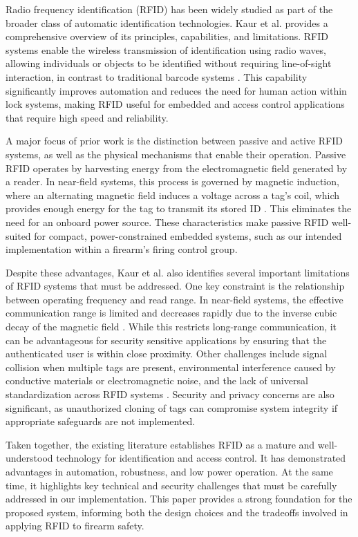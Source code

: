 Radio frequency identification (RFID) has been widely studied as part of the broader 
class of automatic identification technologies. Kaur et al. provides a comprehensive 
overview of its principles, capabilities, and limitations. RFID systems enable the wireless 
transmission of identification using radio waves, allowing individuals or objects to be 
identified without requiring line-of-sight interaction, in contrast to traditional 
barcode systems \cite{kaur2011rfid}. This capability significantly improves automation 
and reduces the need for human action within lock systems, making RFID useful for embedded 
and access control applications that require high speed and reliability. 

A major focus of prior work is the distinction between passive and active RFID systems, 
as well as the physical mechanisms that enable their operation. Passive RFID operates 
by harvesting energy from the electromagnetic field generated by a reader. In near-field 
systems, this process is governed by magnetic induction, where an alternating magnetic
field induces a voltage across a tag's coil, which provides enough energy for the tag to 
transmit its stored ID \cite{kaur2011rfid}. This eliminates the need for an onboard power
source. These characteristics make passive RFID well-suited for compact, power-constrained 
embedded systems, such as our intended implementation within a firearm's firing control group. 

Despite these advantages, Kaur et al. also identifies several important limitations of RFID 
systems that must be addressed. One key constraint is the relationship between operating 
frequency and read range. In near-field systems, the effective communication range is limited 
and decreases rapidly due to the inverse cubic decay of the magnetic field \cite{kaur2011rfid}. 
While this restricts long-range communication, it can be advantageous for security sensitive 
applications by ensuring that the authenticated user is within close proximity. Other challenges 
include signal collision when multiple tags are present, environmental interference caused by conductive 
materials or electromagnetic noise, and the lack of universal standardization across RFID systems \cite{kaur2011rfid}. 
Security and privacy concerns are also significant, as unauthorized cloning of tags can compromise system
 integrity if appropriate safeguards are not implemented.

Taken together, the existing literature establishes RFID as a mature and well-understood
technology for identification and access control. It has demonstrated advantages in
automation, robustness, and low power operation. At the same time, it highlights key
technical and security challenges that must be carefully addressed in our implementation. 
This paper provides a strong foundation for the proposed system, informing both the design 
choices and the tradeoffs involved in applying RFID to firearm safety.
